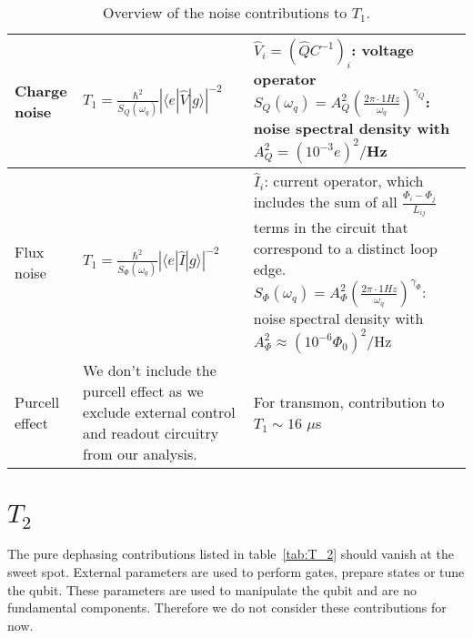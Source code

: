\documentclass[]{article}
\newcommand{\ket}[1]{| #1 \rangle}
\newcommand{\bra}[1]{\langle #1 |}
\begin{document}
\begin{table}[h]
\begin{tabular}{|p{2cm}|p{5.7cm}|p{7.5cm}|}
\hline 
Charge noise & $T_1 = \frac{\hbar^2}{S_{Q}(\omega_q)} \left| \bra{e} \hat{V} \ket{g} \right|^{-2}$~\cite{yan2016}
& $\hat{V}_i=\left(\hat{Q}C^{-1} \right)_i$: voltage operator \newline 
$S_{Q}(\omega_q)=A_Q^2\left( \frac{2\pi \cdot 1 Hz}{\omega_q} \right)^{\gamma_Q}$: noise spectral density with $A_Q^2=(10^{-3}e)^2/$Hz~\cite{krantz2019} \\
\hline
Flux noise & $T_1 = \frac{\hbar^2}{S_{\Phi}(\omega_q)} \left| \bra{e} \hat{I} \ket{g} \right|^{-2}$~\cite{yan2016}
& $\hat{I}_i$: current operator, which includes the sum of all $\frac{\Phi_i-\Phi_j}{L_{ij}}$ terms in the circuit that correspond to a distinct loop edge. \newline 
$S_{\Phi}(\omega_q)=A_{\Phi}^2\left( \frac{2\pi \cdot 1 Hz}{\omega_q} \right)^{\gamma_{\Phi}}$: noise spectral density with $A_{\Phi}^2\approx(10^{-6} \Phi_0)^2/$Hz~\cite{krantz2019} \\
\hline
Purcell effect & We don't include the purcell effect as we exclude external control and readout circuitry from our analysis. 
& For transmon, contribution to  $T_1 \sim 16$ $\mu$s~\cite{koch2007}  \\
\hline

\end{tabular} 
\caption{Overview of the noise contributions to $T_1$.}
\label{tab:T_1}
\end{table}


\section{$T_2$}
The pure dephasing contributions listed in table~\ref{tab:T_2} should vanish at the sweet spot. External parameters are used to perform gates, prepare states or tune the qubit. These parameters are used to manipulate the qubit and are no fundamental components. Therefore we do not consider these contributions for now.
\end{document}
